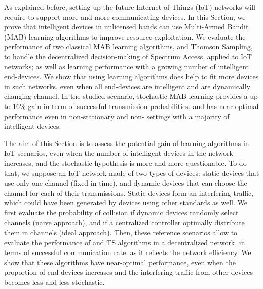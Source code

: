 
\graphicspath{{2-Chapters/4-Chapter/CrownCom_17.git/}}

As explained before, setting up the future Internet of Things (IoT) networks will require to support more and more communicating devices.
In this Section, we prove that intelligent devices in unlicensed bands can use Multi-Armed Bandit (MAB) learning algorithms to improve resource exploitation.
%
We evaluate the performance of two classical MAB learning algorithms, \UCB{} and Thomson Sampling, to handle the decentralized decision-making of Spectrum Access, applied to IoT networks; as well as learning performance with a growing number of intelligent end-devices.
%
We show that using learning algorithms does help to fit more devices in such networks, even when all end-devices are intelligent and are dynamically changing channel.
In the studied scenario, stochastic MAB learning provides a up to $16\%$ gain in term of successful transmission probabilities, and has near optimal performance even in non-stationary and non-\iid{} settings with a majority of intelligent devices.



The aim of this Section is to assess the potential gain of learning algorithms in IoT scenarios, even when the number of intelligent devices in the network increases, and the stochastic hypothesis is more and more questionable.
To do that, we suppose an IoT network made of two types of devices: static devices that use only one channel (fixed in time), and dynamic devices that can choose the channel for each of their transmissions. Static devices form an interfering traffic, which could have been generated by devices using other standards as well.
We first evaluate the probability of collision if dynamic devices randomly select channels (naive approach), and if a centralized controller optimally distribute them in channels (ideal approach).
Then, these reference scenarios allow to evaluate the performance of \UCB{} and TS algorithms in a decentralized network, in terms of successful communication rate, as it reflects the network efficiency.
We show that these algorithms have near-optimal performance, even when the proportion of end-devices increases and the interfering traffic from other devices becomes less and less stochastic.


